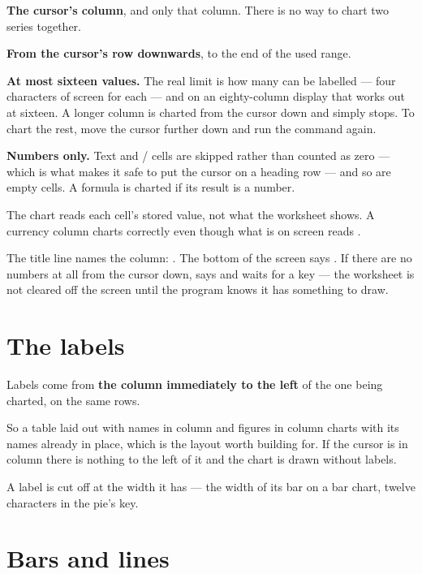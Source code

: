 \begin{ccsteps}
\item \textbf{The cursor's column}, and only that column. There is no way to
chart two series together.
\item \textbf{From the cursor's row downwards}, to the end of the used range.
\item \textbf{At most sixteen values.} The real limit is how many can be
labelled --- four characters of screen for each --- and on an eighty-column
display that works out at sixteen. A longer column is charted from the cursor
down and simply stops. To chart the rest, move the cursor further down and run
the command again.
\item \textbf{Numbers only.} Text and / cells are skipped
rather than counted as zero --- which is what makes it safe to put the cursor on
a heading row --- and so are empty cells. A formula is charted if its result is
a number.
\end{ccsteps}

\begin{ccnote}
The chart reads each cell's stored value, not what the worksheet shows. A
currency column charts correctly even though what is on screen reads
.
\end{ccnote}

The title line names the column: . The bottom of the screen says
. If there are no numbers at all from the cursor down,
\ccprod{} says  and waits for a key --- the worksheet is not
cleared off the screen until the program knows it has something to draw.

\section{The labels}

Labels come from \textbf{the column immediately to the left} of the one being
charted, on the same rows.

So a table laid out with names in column  and figures in column
 charts with its names already in place, which is the layout worth
building for. If the cursor is in column  there is nothing to the
left of it and the chart is drawn without labels.

A label is cut off at the width it has --- the width of its bar on a bar chart,
twelve characters in the pie's key.

\section{Bars and lines}

